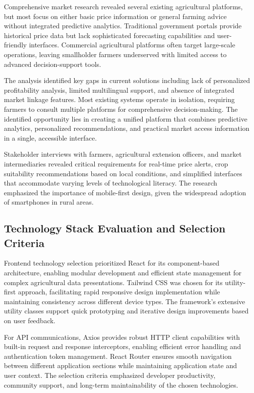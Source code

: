 Comprehensive market research revealed several existing agricultural platforms, but most focus on either basic price information or general farming advice without integrated predictive analytics. Traditional government portals provide historical price data but lack sophisticated forecasting capabilities and user-friendly interfaces. Commercial agricultural platforms often target large-scale operations, leaving smallholder farmers underserved with limited access to advanced decision-support tools.

The analysis identified key gaps in current solutions including lack of personalized profitability analysis, limited multilingual support, and absence of integrated market linkage features. Most existing systems operate in isolation, requiring farmers to consult multiple platforms for comprehensive decision-making. The identified opportunity lies in creating a unified platform that combines predictive analytics, personalized recommendations, and practical market access information in a single, accessible interface.

Stakeholder interviews with farmers, agricultural extension officers, and market intermediaries revealed critical requirements for real-time price alerts, crop suitability recommendations based on local conditions, and simplified interfaces that accommodate varying levels of technological literacy. The research emphasized the importance of mobile-first design, given the widespread adoption of smartphones in rural areas.

\subsection{Technology Stack Evaluation and Selection Criteria}

Frontend technology selection prioritized React for its component-based architecture, enabling modular development and efficient state management for complex agricultural data presentations. Tailwind CSS was chosen for its utility-first approach, facilitating rapid responsive design implementation while maintaining consistency across different device types. The framework's extensive utility classes support quick prototyping and iterative design improvements based on user feedback.

For API communications, Axios provides robust HTTP client capabilities with built-in request and response interceptors, enabling efficient error handling and authentication token management. React Router ensures smooth navigation between different application sections while maintaining application state and user context. The selection criteria emphasized developer productivity, community support, and long-term maintainability of the chosen technologies.

